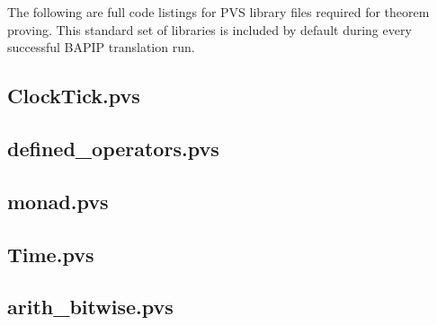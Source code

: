 The following are full code listings for PVS library files required for theorem proving.  This standard set of libraries is included by default during every successful BAPIP translation run.  

\subsection{ClockTick.pvs} \label{app:schedex:pvslib:clock}

\subsection{defined\_operators.pvs} \label{app:schedex:pvslib:ops}

\subsection{monad.pvs} \label{app:schedex:pvslib:monad}

\subsection{Time.pvs} \label{app:schedex:pvslib:time}

\subsection{arith\_bitwise.pvs} \label{app:schedex:pvslib:bitwise}
